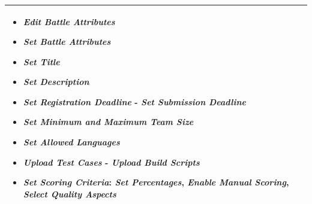 \begin{enumerate}
\begin{center}
\begin{tabular}{ | m{10em} | m{10cm}| }
      \begin{itemize}
          \item \textit{Edit Battle Attributes}
          \item \textit{Set Battle Attributes}
          \item \textit{Set Title}
          \item \textit{Set Description}
          \item \textit{Set Registration Deadline} - \textit{Set Submission Deadline}
          \item \textit{Set Minimum and Maximum Team Size}
          \item \textit{Set Allowed Languages}
          \item \textit{Upload Test Cases} - \textit{Upload Build Scripts}
          \item \textit{Set Scoring Criteria}: \textit{Set Percentages}, \textit{Enable Manual Scoring}, \textit{Select Quality Aspects}
      \end{itemize}
          \\ 
      \hline
    \end{tabular}
    \label{tbl:uc25}
\end{center} 

\end{enumerate}
\newpage
